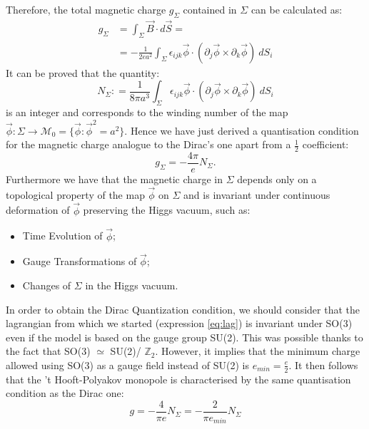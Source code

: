 Therefore, the total magnetic charge $g_\Sigma$ contained in $\Sigma$ can be  calculated as: 
\begin{equation}
\begin{split}
g_\Sigma &= \int_\Sigma \vec{B} \cdot d\vec{S} = \\
         &= - \frac{1}{2ea^2}\int_\Sigma  \epsilon_{ijk} \vec{\phi} \cdot \left(  \partial_j\vec{\phi} \times \partial_k \vec{\phi}  \right) \ dS_i
\end{split}
\end{equation} 
It can be proved that the quantity:
\begin{equation}
N_\Sigma : = \frac{1}{8 \pi a^3} \int_\Sigma  \epsilon_{ijk} \vec{\phi} \cdot \left(  \partial_j\vec{\phi} \times \partial_k \vec{\phi}  \right) \ dS_i
\end{equation}
is an integer and corresponds to the winding number of the map $\vec{\phi} \colon \Sigma \to \mathcal{M}_0 = \{ \vec{\phi} : \vec{\phi}^2 = a^2 \}$. 
Hence we have just derived a quantisation condition for the magnetic charge analogue to the Dirac's one apart from a $\frac{1}{2}$ coefficient: 
\begin{equation}
g_\Sigma = -\frac{4\pi}{e} N_\Sigma.
\end{equation}
Furthermore we have that the magnetic charge in $\Sigma$ depends only on  a topological property of the map $\vec{\phi}$ on $\Sigma$ and is invariant under continuous deformation of $\vec{\phi}$ preserving the Higgs vacuum, such as:
\begin{itemize}
    \item Time Evolution of $\vec{\phi}$;
    \item Gauge Transformations of $\vec{\phi}$;
    \item Changes of $\Sigma$ in the Higgs vacuum.
\end{itemize}
In order to obtain the Dirac Quantization condition, we should consider that the lagrangian from which we started (expression \ref{eq:lag}) is invariant under SO(3) even if the model is based on the gauge group SU(2). This was possible thanks to the fact that SO(3) $ \simeq$ SU(2)/ $\mathbb{Z}_2$. However, it implies that the minimum charge allowed using SO(3) as a gauge field instead of SU(2) is $ e_{min} =\frac{e}{2}$.
It then follows that the 't Hooft-Polyakov monopole is characterised by the same quantisation condition as the Dirac one: 
\begin{equation}
g = - \frac{4}{\pi e} N_\Sigma= - \frac{2}{\pi e_{min}} N_\Sigma
\end{equation}
